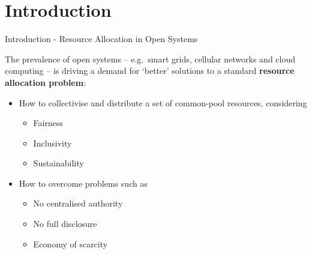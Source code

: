 \section{Introduction}\label{introduction}

\begin{frame}{Introduction - Resource Allocation in Open Systems}

The prevalence of open systems -- e.g.~smart grids, cellular networks
and cloud computing -- is driving a demand for `better' solutions to a
standard \textbf{resource allocation problem}:

\begin{itemize}
\tightlist
\item
  How to collectivise and distribute a set of common-pool resources,
  considering

  \begin{itemize}
  \tightlist
  \item
    Fairness
  \item
    Inclusivity
  \item
    Sustainability
  \end{itemize}
\item
  How to overcome problems such as

  \begin{itemize}
  \tightlist
  \item
    No centralised authority
  \item
    No full disclosure
  \item
    Economy of scarcity
  \end{itemize}
\end{itemize}

\end{frame}

